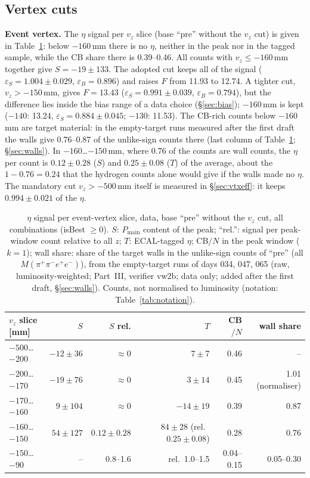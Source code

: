 \documentclass[11pt,a4paper]{article}
\newcommand{\Mfour}{\ensuremath{M(\pi^{+}\pi^{-}e^{+}e^{-})}\xspace}
\newcommand{\Pmain}{\ensuremath{P_{\mathrm{main}}}\xspace}
\newcommand{\vz}{\ensuremath{v_z}\xspace}
\begin{document}
\subsection{Vertex cuts}
\label{sec:vertex}
\textbf{Event vertex.} The $\eta$ signal per $\vz$ slice (base ``pre'' without the $\vz$ cut) is given in
Table~\ref{tab:vzslices}: below $-160$\,mm there is no $\eta$, neither in the peak nor in the tagged sample, while the CB
share there is 0.39--0.46. All counts with $\vz\le-160$\,mm together give $S=-19\pm133$. The adopted cut keeps all of the
signal ($\varepsilon_S=1.004\pm0.029$, $\varepsilon_B=0.896$) and raises $F$ from 11.93 to 12.74. A tighter cut,
$\vz>-150$\,mm, gives $F=13.43$ ($\varepsilon_S=0.991\pm0.039$, $\varepsilon_B=0.794$), but the difference lies inside the
bias range of a data choice (\S\ref{sec:bias}); $-160$\,mm is kept ($-140$: 13.24, $\varepsilon_S=0.884\pm0.045$;
$-130$: 11.53). The CB-rich counts below $-160$\,mm are target material: in the empty-target runs measured after the first draft the walls
give 0.76--0.87 of the unlike-sign counts there (last column of Table~\ref{tab:vzslices}; \S\ref{sec:walls}). In $-160$\dots$-150$\,mm,
where 0.76 of the counts are wall counts, the $\eta$ per count is $0.12\pm0.28$ ($S$) and $0.25\pm0.08$ ($T$) of the average, about the
$1-0.76=0.24$ that the hydrogen counts alone would give if the walls made no $\eta$. The
mandatory cut $\vz>-500$\,mm itself is measured in \S\ref{sec:vtxeff}: it keeps $0.994\pm0.021$ of the $\eta$.

\begin{table}[H]
\centering
\caption{$\eta$ signal per event-vertex slice, data, base ``pre'' without the $\vz$ cut, all combinations
(isBest $\ge0$). $S$: \Pmain content of the peak; ``rel.'': signal per peak-window count relative to all $z$; $T$:
ECAL-tagged $\eta$; CB$/N$ in the peak window ($k=1$); wall share: share of the target walls in the unlike-sign counts of ``pre''
(all \Mfour), from the empty-target runs of days 034, 047, 065 (raw, luminosity-weighted; Part~III, verifier vw2b; data only; added after
the first draft, \S\ref{sec:walls}). Counts, not normalised to luminosity (notation: Table~\ref{tab:notation}).}
\label{tab:vzslices}
\small
\begin{tabular}{@{}l r r r r r@{}}
\toprule
$\vz$ slice [mm] & $S$ & $S$ rel. & $T$ & CB$/N$ & wall share \\
\midrule
$-500$\dots$-200$ & $-12\pm36$ & $\approx0$ & $7\pm7$ & 0.46 & -- \\
$-200$\dots$-170$ & $-19\pm76$ & $\approx0$ & $3\pm14$ & 0.45 & 1.01 (normaliser) \\
$-170$\dots$-160$ & $9\pm104$ & $\approx0$ & $-14\pm19$ & 0.39 & 0.87 \\
$-160$\dots$-150$ & $54\pm127$ & $0.12\pm0.28$ & $84\pm28$ (rel.\ $0.25\pm0.08$) & 0.28 & 0.76 \\
$-150$\dots$-90$ & -- & 0.8--1.6 & rel.\ 1.0--1.5 & 0.04--0.15 & 0.05--0.30 \\
\bottomrule
\end{tabular}
\end{table}
\end{document}
